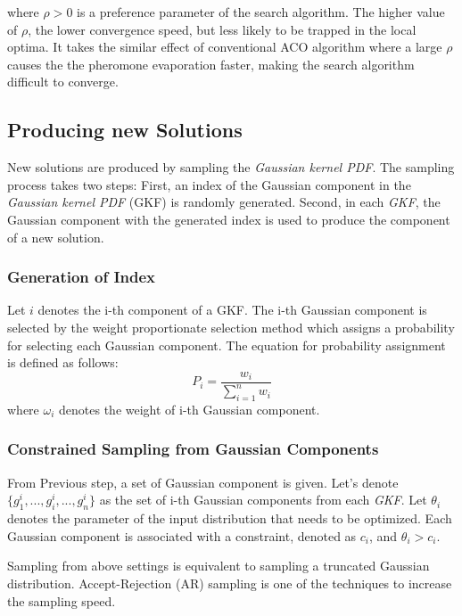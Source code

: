 \documentclass[journal]{IEEEtran}
\begin{document}
where \(\rho > 0\) is a preference parameter of the search algorithm. The higher value of \(\rho\), the lower convergence speed, but less likely to be trapped in the local optima. It takes the similar effect of conventional ACO algorithm where a large \(\rho\) causes the the pheromone evaporation faster, making the search algorithm difficult to converge.

\subsection{Producing new Solutions}
New solutions are produced by sampling the \emph{Gaussian kernel PDF}. The sampling process takes two steps: First, an index of the Gaussian component in the \emph{Gaussian kernel PDF} (GKF) is randomly generated. Second, in each \emph{GKF}, the Gaussian component with the generated index is used to produce the component of a new solution.
\subsubsection{Generation of Index}
Let \(i\) denotes the i-th component of a GKF. The i-th Gaussian component is selected by the weight proportionate selection method which assigns a probability for selecting each Gaussian component. The equation for probability assignment is defined as follows:
\[P_{i} = \frac{w_{i}}{\sum_{i = 1}^{n} w_{i}}\]
where \(\omega_{i}\) denotes the weight of i-th Gaussian component.
\subsubsection{Constrained Sampling from Gaussian Components}
From Previous step, a set of Gaussian component is given. Let's denote \(\{g^i_1,...,g^i_i,...,g^i_n\}\) as the set of i-th Gaussian components from each \emph{GKF}. Let \(\theta_{i}\) denotes the parameter of the input distribution that needs to be optimized. Each Gaussian component is associated with a constraint, denoted as \(c_{i}\), and \(\theta_{i} > c_{i}\).

Sampling from above settings is equivalent to sampling a truncated Gaussian distribution. Accept-Rejection (AR) sampling is one of the techniques to increase the sampling speed.
\end{document}
